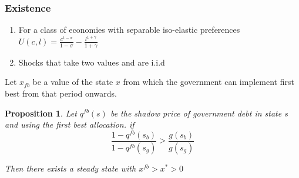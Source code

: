 \documentclass{beamer}
\newtheorem{proposition}{Proposition}
\begin{document}
 \begin{frame}
	\frametitle{Existence}
	
	\begin{enumerate}
	 \item For a class of economies with separable iso-elastic preferences
	 $U(c,l) = \frac{c^{1-\sigma}}{1-\sigma} -\frac{ l^{1+\gamma}}{1+\gamma}$
	 \item Shocks that take two values and are i.i.d
	\end{enumerate}

	
	Let $x_{fb}$ be a value of the state $x$ from which the government can implement first best from that period onwards.  
	
	
	
	
	\begin{proposition}  Let $q^{fb}(s)$ be the shadow price of government debt in state $s$ and using the first best allocation. 
	if 
	\[
		\frac{1-q^{fb}(s_b)}{1-q^{fb}(s_g)} > \frac{g(s_b)}{g(s_g) }
	\] 
	
	Then there exists a steady state with $x^{fb}>x^*>0$
		\end{proposition}
\end{frame}


%
\end{document}
